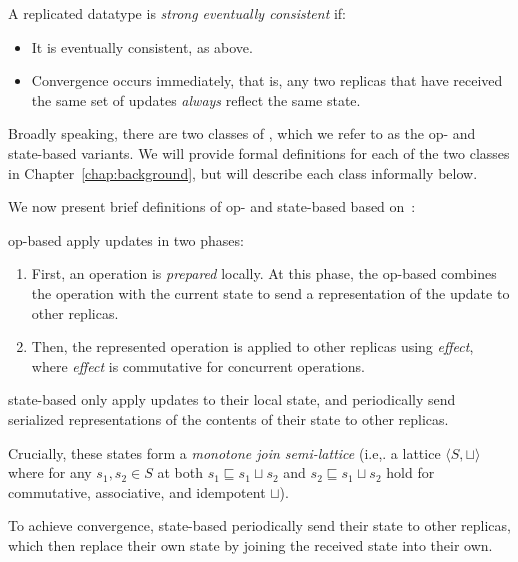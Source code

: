 \begin{definition}
  A replicated datatype is \emph{strong eventually consistent} if:
  \begin{itemize}
    \item It is eventually consistent, as above.
    \item Convergence occurs immediately, that is, any two replicas that have
      received the same set of updates \emph{always} reflect the same state.
  \end{itemize}
\end{definition}

Broadly speaking, there are two classes of \CRDTs, which we refer to as the op-
and state-based variants. We will provide formal definitions for each of the two
classes in Chapter~\ref{chap:background}, but will describe each class
informally below.

We now present brief definitions of op- and state-based \CRDTs based
on~\citet{baquero14}:

\begin{definition}
  op-based \CRDTs apply updates in two phases:
  \begin{enumerate}
    \item First, an operation is \emph{prepared} locally. At this phase, the
      op-based \CRDT combines the operation with the current state to send a
      representation of the update to other replicas.
    \item Then, the represented operation is applied to other replicas using
      \emph{effect}, where \emph{effect} is commutative for concurrent
      operations.
  \end{enumerate}
\end{definition}

\begin{definition}
  state-based \CRDTs only apply updates to their local state, and periodically
  send serialized representations of the contents of their state to other
  replicas.

  Crucially, these states form a \textit{monotone join semi-lattice} (i.e,. a
  lattice $\langle S, \sqcup \rangle$ where for any $s_1, s_2 \in S$ at both
  $s_1 \sqsubseteq s_1 \sqcup s_2$ and $s_2 \sqsubseteq s_1 \sqcup s_2$ hold for
  commutative, associative, and idempotent $\sqcup$).

  To achieve convergence, state-based \CRDTs periodically send their state to
  other replicas, which then replace their own state by joining the received
  state into their own.
\end{definition}

